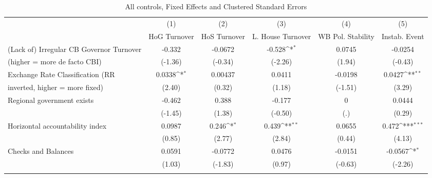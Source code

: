 \begin{table}[htbp]\centering
\def\sym#1{\ifmmode^{#1}\else\(^{#1}\)\fi}
\caption{All controls, Fixed Effects and Clustered Standard Errors \label{fullcmultIndFEDF}}
\begin{tabular}{l*{5}{c}}
\toprule
                                        &\multicolumn{1}{c}{(1)}&\multicolumn{1}{c}{(2)}&\multicolumn{1}{c}{(3)}&\multicolumn{1}{c}{(4)}&\multicolumn{1}{c}{(5)}\\
                                        &\multicolumn{1}{c}{HoG Turnover}&\multicolumn{1}{c}{HoS Turnover}&\multicolumn{1}{c}{L. House Turnover}&\multicolumn{1}{c}{WB Pol. Stability}&\multicolumn{1}{c}{Instab. Event}\\
\midrule
(Lack of) Irregular CB Governor Turnover&   -0.332         &  -0.0672         &   -0.528\sym{*}  &   0.0745         &  -0.0254         \\
(higher = more de facto CBI)            &  (-1.36)         &  (-0.34)         &  (-2.26)         &   (1.94)         &  (-0.43)         \\
\addlinespace
Exchange Rate Classification (RR        &   0.0338\sym{*}  &  0.00437         &   0.0411         &  -0.0198         &   0.0427\sym{**} \\
inverted, higher = more fixed)          &   (2.40)         &   (0.32)         &   (1.18)         &  (-1.51)         &   (3.29)         \\
\addlinespace
Regional government exists              &   -0.462         &    0.388         &   -0.177         &        0         &   0.0444         \\
                                        &  (-1.45)         &   (1.38)         &  (-0.50)         &      (.)         &   (0.29)         \\
\addlinespace
Horizontal accountability index         &   0.0987         &    0.246\sym{*}  &    0.439\sym{**} &   0.0655         &    0.472\sym{***}\\
                                        &   (0.85)         &   (2.77)         &   (2.84)         &   (0.44)         &   (4.13)         \\
\addlinespace
Checks and Balances                     &   0.0591         &  -0.0772         &   0.0476         &  -0.0151         &  -0.0567\sym{*}  \\
                                        &   (1.03)         &  (-1.83)         &   (0.97)         &  (-0.63)         &  (-2.26)         \\
\addlinespace

\end{tabular}
\end{table}

